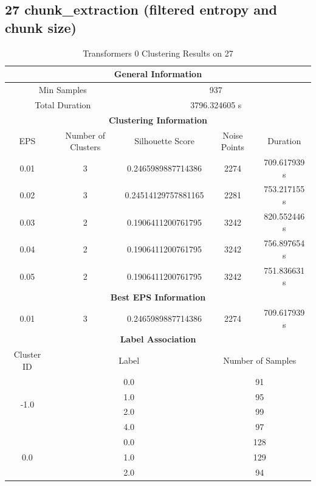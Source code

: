 \subsection{27 chunk\_extraction (filtered entropy and chunk size)}

\begin{longtable}{|c|c|c|c|c|}
\caption{Transformers 0 Clustering Results on 27} \label{tab:27_transformers_0_clustering_results}\\
\hline
\multicolumn{5}{|c|}{\textbf{General Information}} \\
\hline
\multicolumn{2}{|c|}{Min Samples} & \multicolumn{3}{c|}{937} \\
\multicolumn{2}{|c|}{Total Duration} & \multicolumn{3}{c|}{3796.324605 s} \\
\hline
\multicolumn{5}{|c|}{\textbf{Clustering Information}} \\
\hline
EPS & Number of Clusters & Silhouette Score & Noise Points & Duration \\
0.01 & 3 & 0.2465989887714386 & 2274 & 709.617939 s\\
0.02 & 3 & 0.24514129757881165 & 2281 & 753.217155 s\\
0.03 & 2 & 0.1906411200761795 & 3242 & 820.552446 s\\
0.04 & 2 & 0.1906411200761795 & 3242 & 756.897654 s\\
0.05 & 2 & 0.1906411200761795 & 3242 & 751.836631 s\\
\hline
\multicolumn{5}{|c|}{\textbf{Best EPS Information}} \\
\hline
0.01 & 3 & 0.2465989887714386 & 2274 & 709.617939 s\\
\hline
\multicolumn{5}{|c|}{\textbf{Label Association}} \\
\hline
Cluster ID & \multicolumn{2}{c|}{Label} & \multicolumn{2}{c|}{Number of Samples} \\
\hline
\multirow{4}{*}{-1.0} & \multicolumn{2}{c|}{0.0} & \multicolumn{2}{c|}{91} \\
& \multicolumn{2}{c|}{1.0} & \multicolumn{2}{c|}{95} \\
& \multicolumn{2}{c|}{2.0} & \multicolumn{2}{c|}{99} \\
& \multicolumn{2}{c|}{4.0} & \multicolumn{2}{c|}{97} \\
\hline
\multirow{4}{*}{0.0} & \multicolumn{2}{c|}{0.0} & \multicolumn{2}{c|}{128} \\
& \multicolumn{2}{c|}{1.0} & \multicolumn{2}{c|}{129} \\
& \multicolumn{2}{c|}{2.0} & \multicolumn{2}{c|}{94} \\

\end{longtable}

